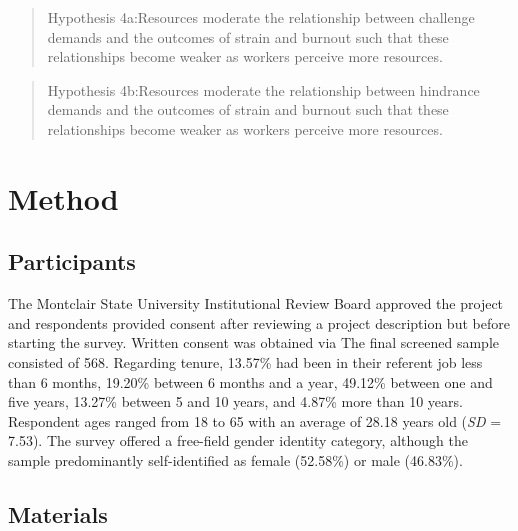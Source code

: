\documentclass[
  man]{apa7}
\begin{document}
\begin{quote}
Hypothesis 4a:Resources moderate the relationship between challenge demands and the outcomes of strain and burnout such that these relationships become weaker as workers perceive more resources.
\end{quote}

\begin{quote}
Hypothesis 4b:Resources moderate the relationship between hindrance demands and the outcomes of strain and burnout such that these relationships become weaker as workers perceive more resources.
\end{quote}

\hypertarget{method}{%
\section{Method}\label{method}}

\hypertarget{participants}{%
\subsection{Participants}\label{participants}}

The Montclair State University Institutional Review Board approved the project and respondents provided consent after reviewing a project description but before starting the survey. Written consent was obtained via The final screened sample consisted of 568. Regarding tenure, 13.57\% had been in their referent job less than 6 months, 19.20\% between 6 months and a year, 49.12\% between one and five years, 13.27\% between 5 and 10 years, and 4.87\% more than 10 years. Respondent ages ranged from 18 to 65 with an average of 28.18 years old (\emph{SD} = 7.53). The survey offered a free-field gender identity category, although the sample predominantly self-identified as female (52.58\%) or male (46.83\%).

\hypertarget{materials}{%
\subsection{Materials}\label{materials}}
\end{document}
